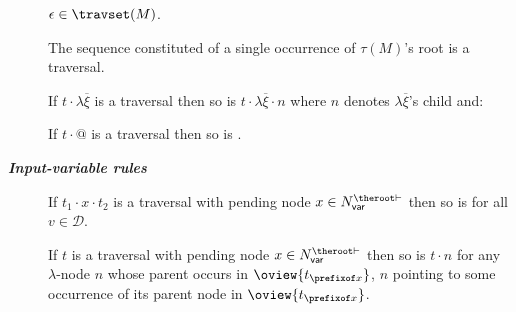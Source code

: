 \begin{FramedTable}
\begin{description}
\item[] $\epsilon \in \travset(M)$.
\item[] The sequence constituted of a single occurrence of $\tau(M)$'s root is a traversal.
\end{description}

\begin{description}
    \item[] If $t \cdot \lambda \overline{\xi}$ is a traversal then so is
        $t \cdot \lambda \overline{\xi} \cdot n$ where $n$ denotes
        $\lambda \overline{\xi}$'s child and:
    \item[] If $t \cdot @$ is a traversal then so is .
\end{description}

\emph{\bf Input-variable rules}
\begin{description}
\item[] If $t_1 \cdot x \cdot t_2$ is a traversal
with pending node $x \in N_{\sf var}^{\theroot\vdash}$ then so
is  for all $v \in \mathcal{D}$.

\item[] If $t$ is a traversal with pending node  $x \in N_{\sf var}^{\theroot\vdash}$ then so is $t \cdot n$ for any $\lambda$-node $n$ whose parent occurs in  $\oview{t_{\prefixof x}}$, $n$ pointing to some occurrence of its  parent node in $\oview{t_{\prefixof x}}$.
\end{description}


\end{FramedTable}
